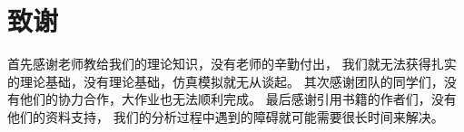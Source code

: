 \documentclass[10pt, conference, compsocconf, a4paper]{IEEEtran}
\begin{document}
\section{致谢}
首先感谢老师教给我们的理论知识，没有老师的辛勤付出，
我们就无法获得扎实的理论基础，没有理论基础，仿真模拟就无从谈起。
其次感谢团队的同学们，没有他们的协力合作，大作业也无法顺利完成。
最后感谢引用书籍的作者们，没有他们的资料支持，
我们的分析过程中遇到的障碍就可能需要很长时间来解决。













 
   



\end{document}
